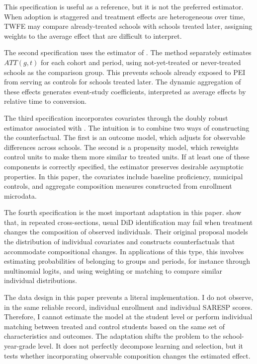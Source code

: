 This specification is useful as a reference, but it is not the preferred estimator. When adoption is staggered and treatment effects are heterogeneous over time, TWFE may compare already-treated schools with schools treated later, assigning weights to the average effect that are difficult to interpret.

The second specification uses the estimator of \textcite{callawaysantanna}. The method separately estimates $ATT(g,t)$ for each cohort and period, using not-yet-treated or never-treated schools as the comparison group. This prevents schools already exposed to PEI from serving as controls for schools treated later. The dynamic aggregation of these effects generates event-study coefficients, interpreted as average effects by relative time to conversion.

The third specification incorporates covariates through the doubly robust estimator associated with \textcite{santannazhao}. The intuition is to combine two ways of constructing the counterfactual. The first is an outcome model, which adjusts for observable differences across schools. The second is a propensity model, which reweights control units to make them more similar to treated units. If at least one of these components is correctly specified, the estimator preserves desirable asymptotic properties. In this paper, the covariates include baseline proficiency, municipal controls, and aggregate composition measures constructed from enrollment microdata.

The fourth specification is the most important adaptation in this paper. \textcite{santannaxu} show that, in repeated cross-sections, usual DiD identification may fail when treatment changes the composition of observed individuals. Their original proposal models the distribution of individual covariates and constructs counterfactuals that accommodate compositional changes. In applications of this type, this involves estimating probabilities of belonging to groups and periods, for instance through multinomial logits, and using weighting or matching to compare similar individual distributions.

The data design in this paper prevents a literal implementation. I do not observe, in the same reliable record, individual enrollment and individual SARESP scores. Therefore, I cannot estimate the model at the student level or perform individual matching between treated and control students based on the same set of characteristics and outcomes. The adaptation shifts the problem to the school-year-grade level. It does not perfectly decompose learning and selection, but it tests whether incorporating observable composition changes the estimated effect.

